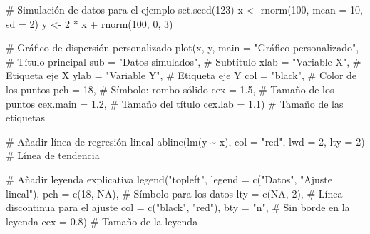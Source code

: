 \documentclass[
  spanish,
  a4paper,
  DIV=11,
  numbers=noendperiod,
  onepage,
  openany]{scrreprt}
\newenvironment{Shaded}{\begin{snugshade}}{\end{snugshade}}
\newcommand{\AttributeTok}[1]{\textcolor[rgb]{0.40,0.45,0.13}{#1}}
\newcommand{\CommentTok}[1]{\textcolor[rgb]{0.37,0.37,0.37}{#1}}
\newcommand{\ConstantTok}[1]{\textcolor[rgb]{0.56,0.35,0.01}{#1}}
\newcommand{\DecValTok}[1]{\textcolor[rgb]{0.68,0.00,0.00}{#1}}
\newcommand{\FloatTok}[1]{\textcolor[rgb]{0.68,0.00,0.00}{#1}}
\newcommand{\FunctionTok}[1]{\textcolor[rgb]{0.28,0.35,0.67}{#1}}
\newcommand{\NormalTok}[1]{\textcolor[rgb]{0.00,0.23,0.31}{#1}}
\newcommand{\OtherTok}[1]{\textcolor[rgb]{0.00,0.23,0.31}{#1}}
\newcommand{\SpecialCharTok}[1]{\textcolor[rgb]{0.37,0.37,0.37}{#1}}
\newcommand{\StringTok}[1]{\textcolor[rgb]{0.13,0.47,0.30}{#1}}
\begin{document}
\begin{Shaded}
\begin{Highlighting}[]
\CommentTok{\# Simulación de datos para el ejemplo}
\FunctionTok{set.seed}\NormalTok{(}\DecValTok{123}\NormalTok{)}
\NormalTok{x }\OtherTok{\textless{}{-}} \FunctionTok{rnorm}\NormalTok{(}\DecValTok{100}\NormalTok{, }\AttributeTok{mean =} \DecValTok{10}\NormalTok{, }\AttributeTok{sd =} \DecValTok{2}\NormalTok{)}
\NormalTok{y }\OtherTok{\textless{}{-}} \DecValTok{2} \SpecialCharTok{*}\NormalTok{ x }\SpecialCharTok{+} \FunctionTok{rnorm}\NormalTok{(}\DecValTok{100}\NormalTok{, }\DecValTok{0}\NormalTok{, }\DecValTok{3}\NormalTok{)}

\CommentTok{\# Gráfico de dispersión personalizado}
\FunctionTok{plot}\NormalTok{(x, y,}
     \AttributeTok{main =} \StringTok{"Gráfico personalizado"}\NormalTok{,  }\CommentTok{\# Título principal}
     \AttributeTok{sub =} \StringTok{"Datos simulados"}\NormalTok{,         }\CommentTok{\# Subtítulo}
     \AttributeTok{xlab =} \StringTok{"Variable X"}\NormalTok{,             }\CommentTok{\# Etiqueta eje X}
     \AttributeTok{ylab =} \StringTok{"Variable Y"}\NormalTok{,             }\CommentTok{\# Etiqueta eje Y}
     \AttributeTok{col =} \StringTok{"black"}\NormalTok{,                   }\CommentTok{\# Color de los puntos}
     \AttributeTok{pch =} \DecValTok{18}\NormalTok{,                        }\CommentTok{\# Símbolo: rombo sólido}
     \AttributeTok{cex =} \FloatTok{1.5}\NormalTok{,                       }\CommentTok{\# Tamaño de los puntos}
     \AttributeTok{cex.main =} \FloatTok{1.2}\NormalTok{,                  }\CommentTok{\# Tamaño del título}
     \AttributeTok{cex.lab =} \FloatTok{1.1}\NormalTok{)                   }\CommentTok{\# Tamaño de las etiquetas}

\CommentTok{\# Añadir línea de regresión lineal}
\FunctionTok{abline}\NormalTok{(}\FunctionTok{lm}\NormalTok{(y }\SpecialCharTok{\textasciitilde{}}\NormalTok{ x), }\AttributeTok{col =} \StringTok{"red"}\NormalTok{, }\AttributeTok{lwd =} \DecValTok{2}\NormalTok{, }\AttributeTok{lty =} \DecValTok{2}\NormalTok{)  }\CommentTok{\# Línea de tendencia}

\CommentTok{\# Añadir leyenda explicativa}
\FunctionTok{legend}\NormalTok{(}\StringTok{"topleft"}\NormalTok{,}
       \AttributeTok{legend =} \FunctionTok{c}\NormalTok{(}\StringTok{"Datos"}\NormalTok{, }\StringTok{"Ajuste lineal"}\NormalTok{),}
       \AttributeTok{pch =} \FunctionTok{c}\NormalTok{(}\DecValTok{18}\NormalTok{, }\ConstantTok{NA}\NormalTok{),               }\CommentTok{\# Símbolo para los datos}
       \AttributeTok{lty =} \FunctionTok{c}\NormalTok{(}\ConstantTok{NA}\NormalTok{, }\DecValTok{2}\NormalTok{),                }\CommentTok{\# Línea discontinua para el ajuste}
       \AttributeTok{col =} \FunctionTok{c}\NormalTok{(}\StringTok{"black"}\NormalTok{, }\StringTok{"red"}\NormalTok{),}
       \AttributeTok{bty =} \StringTok{"n"}\NormalTok{,                     }\CommentTok{\# Sin borde en la leyenda}
       \AttributeTok{cex =} \FloatTok{0.8}\NormalTok{)                     }\CommentTok{\# Tamaño de la leyenda}


\end{Highlighting}
\end{Shaded}
\end{document}
